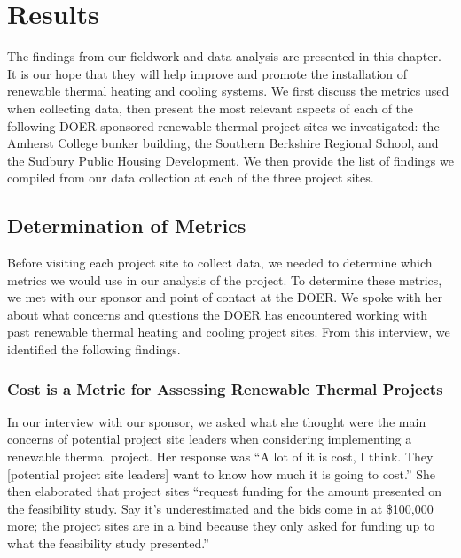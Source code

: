 
\chapter{Results}
\par The findings from our fieldwork and data analysis are presented in this chapter. It is our hope that they will help improve and promote the installation of renewable thermal heating and cooling systems. We first discuss the metrics used when collecting data, then present the most relevant aspects of each of the following DOER-sponsored renewable thermal project sites we investigated: the Amherst College bunker building, the Southern Berkshire Regional School, and the Sudbury Public Housing Development. We then provide the list of findings we compiled from our data collection at each of the three project sites.

\section{Determination of Metrics}
\par Before visiting each project site to collect data, we needed to determine which metrics we would use in our analysis of the project. To determine these metrics, we met with our sponsor and point of contact at the DOER. We spoke with her about what concerns and questions the DOER has encountered working with past renewable thermal heating and cooling project sites. From this interview, we identified the following findings.

\subsection{Cost is a Metric for Assessing Renewable Thermal Projects}
\par In our interview with our sponsor, we asked what she thought were the main concerns of potential project site leaders when considering implementing a renewable thermal project. Her response was “A lot of it is cost, I think. They [potential project site leaders] want to know how much it is going to cost.” She then elaborated that project sites “request funding for the amount presented on the feasibility study. Say it’s underestimated and the bids come in at \$100,000 more; the project sites are in a bind because they only asked for funding up to what the feasibility study presented.”

